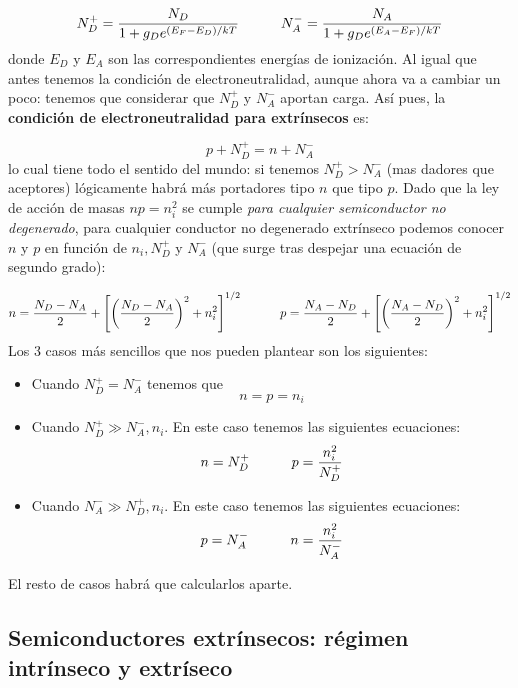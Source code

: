 \begin{equation}
	N_D^+ = \frac{N_D}{1+g_D e^{(E_F-E_D)/kT}} \quad \quad \quad
	N_A^- = \frac{N_A}{1+g_D e^{(E_A-E_F)/kT}}
\end{equation}
donde $E_D$ y $E_A$ son las correspondientes energías de ionización. Al igual que antes tenemos la condición de electroneutralidad, aunque ahora va a cambiar un poco: tenemos que considerar que $N_D^+$ y $N_A^-$ aportan carga. Así pues, la \textbf{condición de electroneutralidad para extrínsecos} es:

\begin{equation}
	p + N_D^+ = n + N_A^-
\end{equation}
lo cual tiene todo el sentido del mundo: si tenemos $N_D^+>N_A^-$ (mas dadores que aceptores) lógicamente habrá más portadores tipo $n$ que tipo $p$. Dado que la ley de acción de masas $np=n_i^2$ se cumple \textit{para cualquier semiconductor no degenerado}, para cualquier conductor no degenerado extrínseco podemos conocer $n$ y $p$ en función de $n_i,N_D^+$ y $N_A^-$ (que surge tras despejar una ecuación de segundo grado):

\begin{equation}
	n = \frac{N_D-N_A}{2} + \left[ \left( \frac{N_D-N_A}{2} \right)^2 + n_i^2 \right]^{1/2} \quad \quad \quad p = \frac{N_A-N_D}{2} + \left[ \left( \frac{N_A-N_D}{2} \right)^2 + n_i^2 \right]^{1/2}
\end{equation}
Los 3 casos más sencillos que nos pueden plantear son los siguientes:

\begin{itemize}
	\item Cuando $N_D^+=N_A^-$ tenemos que
	      \begin{equation}
		      n=p=n_i
	      \end{equation}
	\item Cuando $N_D^+ \gg N_A^-,n_i$. En este caso tenemos las siguientes ecuaciones:
	      \begin{equation}
		      n=N_D^+ \quad \quad \quad p = \frac{n_i^2}{N_D^+}
	      \end{equation}
	\item Cuando $N_A^-\gg N_D^+,n_i$. En este caso tenemos las siguientes ecuaciones:
	      \begin{equation}
		      p=N_A^- \quad \quad \quad n = \frac{n_i^2}{N_A^-}
	      \end{equation}
\end{itemize}
El resto de casos habrá que calcularlos aparte.

\subsection{Semiconductores extrínsecos: régimen intrínseco y extríseco}

